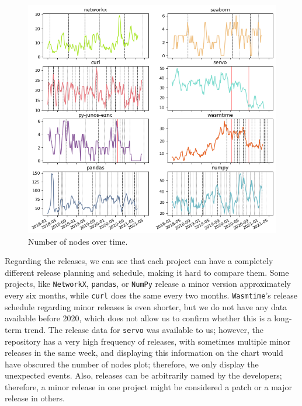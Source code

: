 \begin{figure}[!htbp]
    \centering
    \includegraphics[width=\textwidth]{figures/qualitative/number_of_nodes/all_v2.png}
    \caption{Number of nodes over time.}
    \label{fig:nnodes}
\end{figure}

Regarding the releases, we can see that each project can have a completely different release planning and schedule, making it hard to compare them. Some projects, like \texttt{NetworkX}, \texttt{pandas}, or \texttt{NumPy} release a minor version approximately every six months, while \texttt{curl} does the same every two months. \texttt{Wasmtime}'s release schedule regarding minor releases is even shorter, but we do not have any data available before 2020, which does not allow us to confirm whether this is a long-term trend. The release data for \texttt{servo} was available to us; however, the repository has a very high frequency of releases, with sometimes multiple minor releases in the same week, and displaying this information on the chart would have obscured the number of nodes plot; therefore, we only display the unexpected events. Also, releases can be arbitrarily named by the developers; therefore, a minor release in one project might be considered a patch or a major release in others.

